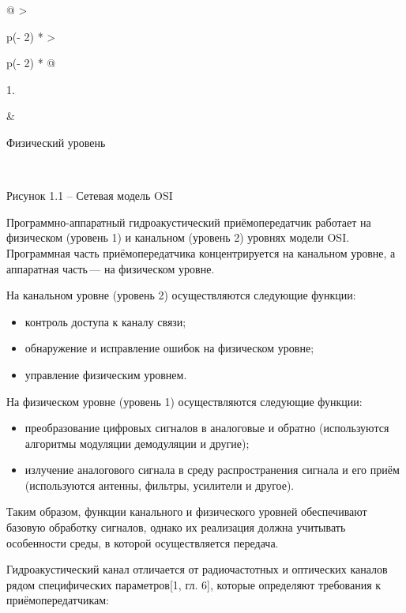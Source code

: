 \begin{longtable}[]{@{}
  >{\raggedright\arraybackslash}p{(\columnwidth - 2\tabcolsep) * }
  >{\raggedright\arraybackslash}p{(\columnwidth - 2\tabcolsep) * }@{}}
\toprule\noalign{}
\begin{minipage}[b]{\linewidth}\raggedright
1.
\end{minipage} & \begin{minipage}[b]{\linewidth}\raggedright
Физический уровень
\end{minipage} \\
\midrule\noalign{}
\endhead
\bottomrule\noalign{}
\endlastfoot
\end{longtable}

Рисунок 1.1 -- Сетевая модель OSI

Программно-аппаратный гидроакустический приёмопередатчик работает на
физическом (уровень 1) и канальном (уровень 2) уровнях модели OSI.
Программная часть приёмопередатчика концентрируется на канальном уровне,
а аппаратная часть\,--- на физическом уровне.

На канальном уровне (уровень 2) осуществляются следующие функции:

\begin{itemize}
\item
  контроль доступа к каналу связи;
\item
  обнаружение и исправление ошибок на физическом уровне;
\item
  управление физическим уровнем.
\end{itemize}

На физическом уровне (уровень 1) осуществляются следующие функции:

\begin{itemize}
\item
  преобразование цифровых сигналов в аналоговые и обратно (используются
  алгоритмы модуляции демодуляции и другие);
\item
  излучение аналогового сигнала в среду распространения сигнала и его
  приём (используются антенны, фильтры, усилители и другое).
\end{itemize}

Таким образом, функции канального и физического уровней обеспечивают
базовую обработку сигналов, однако их реализация должна учитывать
особенности среды, в которой осуществляется передача.

Гидроакустический канал отличается от радиочастотных и оптических
каналов рядом специфических параметров{[}1, гл. 6{]}, которые определяют
требования к приёмопередатчикам:

